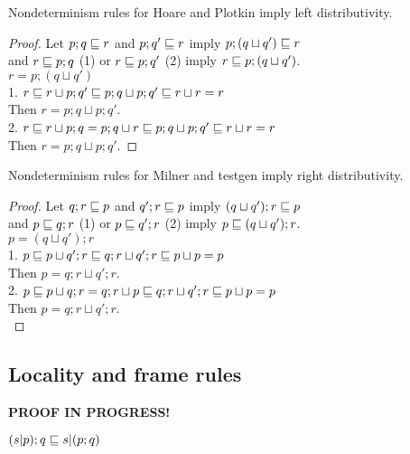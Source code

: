 \documentclass{article}
\begin{document}
\begin{theorem}
Nondeterminism rules for Hoare and Plotkin imply left distributivity.
\end{theorem}

\begin{proof}
Let $p; q \sqsubseteq r$ and $p; q' \sqsubseteq r$ imply $p; (q \sqcup q') \sqsubseteq r$\\
and $r \sqsubseteq p; q$ (1) or $r \sqsubseteq p; q'$ (2) imply $r \sqsubseteq p; (q \sqcup q')$.\\
$r = p; (q \sqcup q')$\\
1. $r \sqsubseteq r \sqcup p; q' \sqsubseteq p; q \sqcup p; q' \sqsubseteq r \sqcup r = r$\\
Then $r = p; q \sqcup p; q'$.\\
2. $r \sqsubseteq r \sqcup p; q = p; q \sqcup r \sqsubseteq p; q \sqcup p; q' \sqsubseteq r \sqcup r = r$\\
Then $r = p; q \sqcup p; q'$.
\end{proof}

\begin{theorem}
Nondeterminism rules for Milner and testgen imply right distributivity.
\end{theorem}

\begin{proof}
Let $q; r \sqsubseteq p$ and $q'; r \sqsubseteq p$ imply $(q \sqcup q'); r \sqsubseteq p$\\
and $p \sqsubseteq q; r$ (1) or $p \sqsubseteq q'; r$ (2) imply $p \sqsubseteq (q \sqcup q'); r$.\\
$p = (q \sqcup q'); r$\\
1. $p \sqsubseteq p \sqcup q'; r \sqsubseteq q; r \sqcup q'; r \sqsubseteq p \sqcup p = p$\\
Then $p = q; r \sqcup q'; r$.\\
2. $p \sqsubseteq p \sqcup q; r = q; r \sqcup p \sqsubseteq q; r \sqcup q'; r \sqsubseteq p \sqcup p = p$\\
Then $p = q; r \sqcup q'; r$.\\
\end{proof}

\subsection*{Locality and frame rules}

\textbf{PROOF IN PROGRESS!}

\begin{law}
$(s | p); q \sqsubseteq s | (p; q)$
\end{law}
\end{document}
